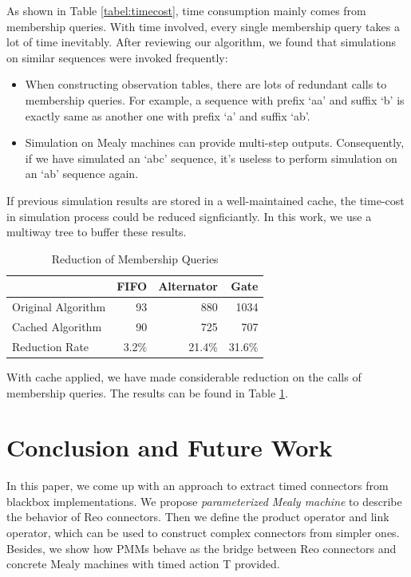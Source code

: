 \documentclass[conference, a4paper]{IEEEtran}
\begin{document}
As shown in Table \ref{tabel:timecost}, time consumption mainly comes from membership queries.
With time involved, every single membership query takes a lot of time inevitably.
After reviewing our algorithm, we found that simulations on similar sequences were invoked frequently:

\begin{itemize}
  \item When constructing observation tables, there are lots of redundant calls to membership
    queries. For example, a sequence with prefix `aa' and suffix `b' is exactly same as another one
    with prefix `a' and suffix `ab'.
  \item Simulation on Mealy machines can provide multi-step outputs.  Consequently, if we have
    simulated an `abc' sequence, it's useless to perform simulation on an `ab' sequence again.
\end{itemize}

If previous simulation results are stored in a well-maintained cache, the time-cost in
simulation process could be reduced signficiantly. In this work, we use a multiway tree to buffer
these results.

\begin{table}[ht]
  \renewcommand{\arraystretch}{1.3}
  \caption{Reduction of Membership Queries}
  \label{tabel:cacheoptimization}
  \centering
  \begin{tabular}{l||rrr}
    \hline
    & FIFO & Alternator & Gate \\
    \hline\hline
    Original Algorithm & 93 & 880 & 1034 \\
    Cached Algorithm & 90 & 725 & 707 \\
    Reduction Rate & 3.2\% & 21.4\% & 31.6\% \\
    \hline
  \end{tabular}
\end{table}

With cache applied, we have made considerable reduction on the calls of membership queries. The results
can be found in Table \ref{tabel:cacheoptimization}.

\section{Conclusion and Future Work}
In this paper, we come up with an approach to extract timed connectors from blackbox
implementations. We propose \emph{parameterized Mealy machine} to describe the behavior of Reo
connectors. Then we define the product operator and link operator, which can be used to
construct complex connectors from simpler ones.
Besides, we show how PMMs behave as the bridge between Reo connectors and concrete Mealy
machines with timed action T provided. 
\end{document}
